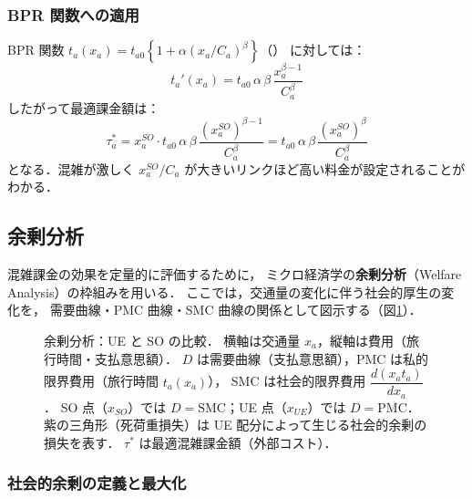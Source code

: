 \subsubsection*{BPR 関数への適用}

BPR 関数 $t_a(x_a) = t_{a0}\left\{1 + \alpha(x_a/C_a)^\beta\right\}$（）
に対しては：
\begin{equation}
  t_a'(x_a) = t_{a0}\,\alpha\,\beta\,\frac{x_a^{\beta-1}}{C_a^{\beta}}
  \label{eq:bpr-deriv}
\end{equation}
したがって最適課金額は：
\begin{equation}
  \tau_a^* = x_a^{SO} \cdot t_{a0}\,\alpha\,\beta\,
               \frac{(x_a^{SO})^{\beta-1}}{C_a^{\beta}}
           = t_{a0}\,\alpha\,\beta\,\frac{(x_a^{SO})^{\beta}}{C_a^{\beta}}
  \label{eq:bpr-toll}
\end{equation}
となる．混雑が激しく $x_a^{SO}/C_a$ が大きいリンクほど高い料金が設定されることがわかる．

\subsection{余剰分析}
\label{subsec:surplus-analysis}

混雑課金の効果を定量的に評価するために，
ミクロ経済学の\textbf{余剰分析}（Welfare Analysis）の枠組みを用いる\cite{土木学会1998}．
ここでは，交通量の変化に伴う社会的厚生の変化を，
需要曲線・PMC 曲線・SMC 曲線の関係として図示する（図\ref{fig:surplus-analysis}）．

\begin{figure}[hbtp]
  \centering
  
  \caption{余剰分析：UE と SO の比較．
           横軸は交通量 $x_a$，縦軸は費用（旅行時間・支払意思額）．
           $D$ は需要曲線（支払意思額），PMC は私的限界費用（旅行時間 $t_a(x_a)$），
           SMC は社会的限界費用 $\dfrac{d(x_a t_a)}{dx_a}$．
           SO 点（$x_{SO}$）では $D = \text{SMC}$；UE 点（$x_{UE}$）では $D = \text{PMC}$．
           紫の三角形（死荷重損失）は UE 配分によって生じる社会的余剰の損失を表す．
           $\tau^*$ は最適混雑課金額（外部コスト）．}
  \label{fig:surplus-analysis}
\end{figure}

\subsubsection*{社会的余剰の定義と最大化}

